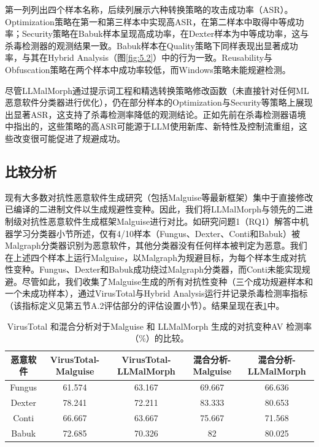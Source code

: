 第一列列出四个样本名称，后续列展示六种转换策略的攻击成功率（ASR）。Optimization策略在第一和第三样本中实现高ASR，在第二样本中取得中等成功率；Security策略在Babuk样本呈现高成功率，在Dexter样本为中等成功率，这与杀毒检测器的观测结果一致。Babuk样本在Quality策略下同样表现出显著成功率，与其在Hybrid Analysis（图\ref{fig:5.2}）中的行为一致。Reusability与Obfuscation策略在两个样本中成功率较低，而Windows策略未能规避检测。


尽管LLMalMorph通过提示词工程和精选转换策略修改函数（未直接针对任何ML恶意软件分类器进行优化），仍在部分样本的Optimization与Security等策略上展现出显著ASR，这支持了杀毒检测率降低的观测结论。正如先前在杀毒检测器语境中指出的，这些策略的高ASR可能源于LLM使用新库、新特性及控制流重组，这些改变很可能促进了规避成功。

\subsection{比较分析}
现有大多数对抗性恶意软件生成研究（包括Malguise\parencite{Ling2024}等最新框架）集中于直接修改已编译的二进制文件以生成规避性变种。因此，我们将LLMalMorph与领先的二进制级对抗性恶意软件生成框架Malguise进行对比。如研究问题1（RQ1）解答中机器学习分类器小节所述，仅有4/10样本（Fungus、Dexter、Conti和Babuk）被Malgraph分类器识别为恶意软件，其他分类器没有任何样本被判定为恶意。我们在上述四个样本上运行Malguise\parencite{Ling2024}，以Malgraph为规避目标，为每个样本生成对抗性变种。Fungus、Dexter和Babuk成功绕过Malgraph分类器，而Conti未能实现规避。尽管如此，我们收集了Malguise生成的所有对抗性变种（三个成功规避样本和一个未成功样本），通过VirusTotal与Hybrid Analysis运行并记录杀毒检测率指标（该指标定义见第五节A.2评估部分的评估设置小节）。结果呈现在表\ref{tab:5.2}中。

\begin{table}[htbp]
	\centering
	\caption{VirusTotal 和混合分析对于Malguise 和 LLMalMorph 生成的对抗变种AV 检测率（\%）的比较。}
	\label{tab:5.2}
	\begin{tabular*}{\textwidth}{@{\extracolsep{\fill}}ccccc}
		\toprule
		恶意软件 & VirusTotal-Malguise & VirusTotal-LLMalMorph & 混合分析-Malguise & 混合分析-LLMalMorph \\
		\midrule
		Fungus & 61.574 & 63.167 & 69.667 & 66.636 \\
		Dexter & 78.241 & 72.211 & 83.333 & 80.653 \\
		Conti & 66.667 & 63.667 & 75.667 & 71.568 \\
		Babuk & 72.685 & 70.326 & 82 & 80.025 \\
		\bottomrule
	\end{tabular*}
\end{table}

